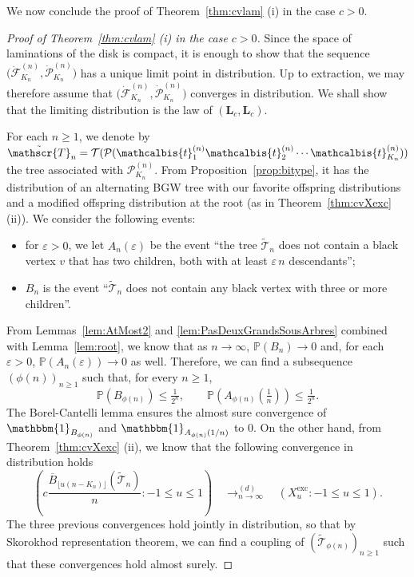 \documentclass[AHL,XML,longabstracts,Unicode]{cedram}
\def\eps{\varepsilon}
\def\PPP{\mathcal P}
\def\PKn{\mathcal{P}^{(n)}_{K_{n}}}
\def\dFKn{\dot{\mathcal{F}}^{(n)}_{K_{n}}}
\def\dPKn{\dot{\mathcal{P}}^{(n)}_{K_{n}}}
\def\oB{\overline{B}}
\def \Xexc{X^{\mathrm{exc}}}
\def\tTs{\tilde{\Ts}}
\def\tb{\mathcalbis{t}}
\def\Ts{\mathscr{T}}
\renewcommand{\epsilon}{\varepsilon}
\renewcommand\Pr[1]{\mathbb{P}\left(#1\right)}
\def\One{\mathbbm{1}}
\begin{document}
We now conclude the proof of Theorem~\ref{thm:cvlam} (i) in the case $c>0$.
\begin{proof}[Proof of Theorem~\ref{thm:cvlam} (i) in the case $c>0$]
  Since the space of laminations of the disk is compact,
  it is enough to show that the sequence $\big( \dFKn  ,  \dPKn \big) $ has a unique  limit point in distribution. Up to extraction, we may therefore assume that $\big( \dFKn  ,  \dPKn \big)$  converges in distribution. We shall show that the limiting distribution is the law of $(\mathbf{L}_c,\mathbf{L}_c)$.

  For each $n \ge 1$, we denote by $\tTs_n= \mathcal{T}( \PPP( \tb_{1}^{(n)} \tb_{2}^{(n)} \cdots \tb_{K_{n}}^{(n)}))$
  the tree associated with $\PKn$.
  From Proposition~\ref{prop:bitype}, it has the distribution of an alternating BGW tree with our favorite offspring distributions
  and a modified offspring distribution at the root (as in Theorem~\ref{thm:cvXexc} (ii)).
  We consider the following events:
  \begin{itemize}
    \item for $\epsilon >0$, we let $A_{n}(\epsilon)$ be the event ``the tree $\tTs_{n}$ does not contain a black
    vertex $v$ that has two children, both with at least $\eps \, n$ descendants'';
        \item $B_{n}$ is the event ``$\tTs_{n}$ does not contain any black vertex with three or more children''.
  \end{itemize}
  From Lemmas~\ref{lem:AtMost2} and \ref{lem:PasDeuxGrandsSousArbres} combined with Lemma~\ref{lem:root}, we know that
   as $n \rightarrow \infty$, $\Pr{B_{n}} \rightarrow 0$ and, for each $\eps >0$, $\Pr{A_{n}(\epsilon)} \rightarrow 0$ as well.
  Therefore, we can find a subsequence $(\phi(n))_{n \geq 1}$ such that, for every $n \geq 1$,
  \[ \Pr{{B_{\phi (n)}}} \leq \tfrac{1}{2^{n}}, \qquad \Pr{{A_{ \phi(n)} (\tfrac1n)}} \leq  \tfrac{1}{2^{n}}.\]
  The Borel-Cantelli lemma ensures the almost sure convergence of
  $\One_{B_{\phi (n)}}$ and $\One_{A_{ \phi(n)} (1/n)}$ to $0$.
  On the other hand, from Theorem~\ref{thm:cvXexc} (ii), we know that the following convergence in distribution holds
  \[  \left(  c \frac{\oB_{\lfloor u (n-K_{n}) \rfloor}(\tilde{\Ts}_{n})}{ n} : -1 \leq u \leq 1\right)  \quad \mathop{\longrightarrow}^{(d)}_{n \rightarrow \infty} \quad (\Xexc_{u}: -1 \leq u \leq 1).\]
  The three previous convergences hold jointly in distribution, so that by Skorokhod representation theorem,
  we can find a coupling of  $(\tTs_{\phi(n)})_{n \ge 1}$ such that these convergences hold almost surely.

\end{proof}
\end{document}
